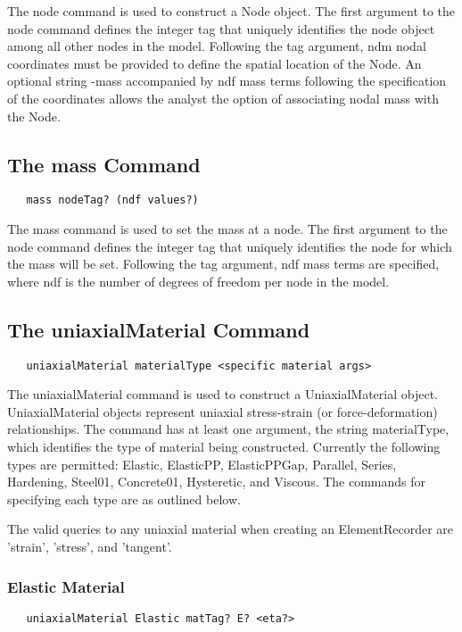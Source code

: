 \documentclass[12pt]{article}
\begin{document}
The node command is used to construct a Node object. The first
argument to the node command defines the integer tag that uniquely
identifies the node object among all other nodes in the model. Following the tag
argument, ndm nodal coordinates must be provided to define the spatial
location of the Node. An optional string -mass accompanied by ndf
mass terms following the specification of the coordinates allows the
analyst the option of associating nodal mass with the Node.

\subsection{The mass Command}
{\sf\small
\begin{verbatim}
   mass nodeTag? (ndf values?)
\end{verbatim}
}

The mass command is used to set the mass at a node. The first
argument to the node command defines the integer tag that uniquely
identifies the node for which the mass will be set. Following the tag
argument, ndf mass terms are specified, where ndf is the number of
degrees of freedom per node in the model.

\subsection{The uniaxialMaterial Command}
{\sf\small
\begin{verbatim}
   uniaxialMaterial materialType <specific material args>
\end{verbatim}
}

The uniaxialMaterial command is used to construct a UniaxialMaterial object. 
UniaxialMaterial objects represent uniaxial stress-strain (or force-deformation)
relationships. The command has at least one argument, the string materialType, which
identifies the type of material being constructed. Currently the following types 
are permitted: Elastic, ElasticPP, ElasticPPGap, Parallel, Series, Hardening,
Steel01, Concrete01, Hysteretic, and Viscous. The commands for specifying each type are
as outlined below.

The valid queries to any uniaxial material when creating an ElementRecorder
are 'strain', 'stress', and 'tangent'.

\subsubsection{Elastic Material}
{\sf\small
\begin{verbatim}
   uniaxialMaterial Elastic matTag? E? <eta?>
\end{verbatim}
}
\end{document}

